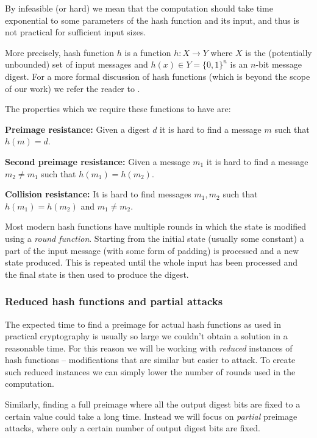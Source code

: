 By infeasible (or hard) we mean that the computation should take time exponential to some parameters of the hash function and its input, and thus is not practical for sufficient input sizes.

More precisely, hash function $h$ is a function $h: X \to Y$ where $X$ is the (potentially unbounded) set of input messages and $h(x) \in Y = \{0,1\}^n$ is an $n$-bit message digest.
For a more formal discussion of hash functions (which is beyond the scope of our work) we refer the reader to \cite{rogaway2004cryptographic}.

The properties which we require these functions to have are:

\textbf{Preimage resistance:} Given a digest $d$ it is hard to find a message $m$ such that $h(m) = d$.

\textbf{Second preimage resistance:} Given a message $m_1$ it is hard to find a message $m_2 \neq m_1$ such that $h(m_1) = h(m_2)$.

\textbf{Collision resistance:} It is hard to find messages $m_1,m_2$ such that $h(m_1) = h(m_2)$ and $m_1 \neq m_2$.


Most modern hash functions have multiple rounds in which the state is modified using a \emph{round function}.
Starting from the initial state (usually some constant) a part of the input message (with some form of padding) is processed and a new state produced.
This is repeated until the whole input has been processed and the final state is then used to produce the digest.

\subsubsection{Reduced hash functions and partial attacks}
The expected time to find a preimage for actual hash functions as used in practical cryptography is usually so large we couldn't obtain a solution in a reasonable time.
For this reason we will be working with \emph{reduced} instances of hash functions -- modifications that are similar but easier to attack.
To create such reduced instances we can simply lower the number of rounds used in the computation.

Similarly, finding a full preimage where all the output digest bits are fixed to a certain value could take a long time.
Instead we will focus on \emph{partial} preimage attacks, where only a certain number of output digest bits are fixed.

